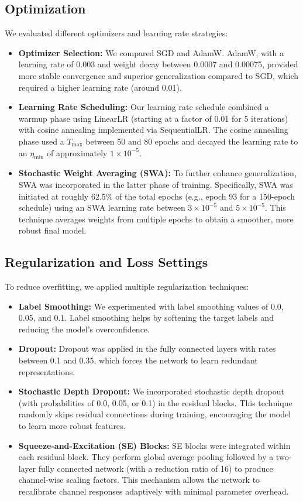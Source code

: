 \documentclass[letterpaper]{article}
\begin{document}
\subsection{Optimization}
We evaluated different optimizers and learning rate strategies:
\begin{itemize}
    \item \textbf{Optimizer Selection:} We compared SGD and AdamW. AdamW, \cite{loshchilov2019decoupled} with a learning rate of 0.003 and weight decay between 0.0007 and 0.00075, provided more stable convergence and superior generalization compared to SGD, which required a higher learning rate (around 0.01).
    \item \textbf{Learning Rate Scheduling:} Our learning rate schedule combined a warmup phase using LinearLR (starting at a factor of 0.01 for 5 iterations) with cosine annealing \cite{loshchilov2016sgdr} implemented via SequentialLR. The cosine annealing phase used a $T_{\text{max}}$ between 50 and 80 epochs and decayed the learning rate to an $\eta_{\text{min}}$ of approximately $1\times10^{-5}$.
    \item \textbf{Stochastic Weight Averaging (SWA):} To further enhance generalization, SWA \cite{izmailov2018averaging} was incorporated in the latter phase of training. Specifically, SWA was initiated at roughly 62.5\% of the total epochs (e.g., epoch 93 for a 150-epoch schedule) using an SWA learning rate between $3\times10^{-5}$ and $5\times10^{-5}$. This technique averages weights from multiple epochs to obtain a smoother, more robust final model.
\end{itemize}

\subsection{Regularization and Loss Settings}
To reduce overfitting, we applied multiple regularization techniques:
\begin{itemize}
    \item \textbf{Label Smoothing:}  \cite{szegedy2016rethinking} We experimented with label smoothing values of 0.0, 0.05, and 0.1. Label smoothing helps by softening the target labels and reducing the model's overconfidence.
    \item \textbf{Dropout:} Dropout was applied in the fully connected layers with rates between 0.1 and 0.35, which forces the network to learn redundant representations.
    \item \textbf{Stochastic Depth Dropout:} We incorporated stochastic depth dropout \cite{huang2016deep} (with probabilities of 0.0, 0.05, or 0.1) in the residual blocks. This technique randomly skips residual connections during training, encouraging the model to learn more robust features.
    \item \textbf{Squeeze-and-Excitation (SE) Blocks:} SE blocks were integrated within each residual block. They perform global average pooling followed by a two-layer fully connected network (with a reduction ratio of 16) to produce channel-wise scaling factors. This mechanism allows the network to recalibrate channel responses adaptively with minimal parameter overhead.
\end{itemize}
\end{document}
